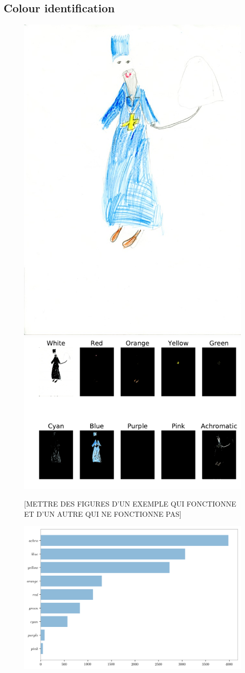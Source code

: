 \documentclass[11pt,a4paper]{article}
\begin{document}
\subsection{Colour identification}

\begin{figure}[!h]
	\centering
	\includegraphics[width=0.32\linewidth]{figures/ru08_bo_f_pb_07_05_don-r}
	\includegraphics[width=0.62\linewidth]{figures/ru08_bo_f_pb_07_05_don-rno_filter_mask.pdf}
	\caption{{[METTRE DES FIGURES D'UN EXEMPLE QUI FONCTIONNE ET D'UN AUTRE QUI NE FONCTIONNE PAS]} }
	\label{}
\end{figure}

\begin{figure}[!h]
	\centering
	\includegraphics[width=\linewidth]{figures/colors-barplot.png}
	\caption{ }
	\label{}
\end{figure}
\end{document}
